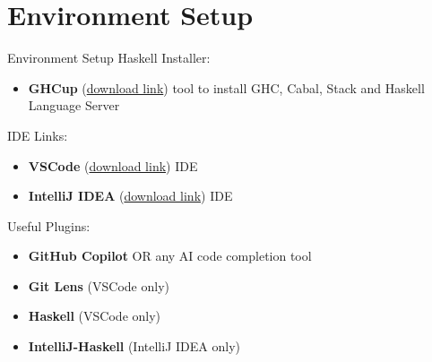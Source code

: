 \section{Environment Setup}
\begin{frame}{Environment Setup}
    Haskell Installer:
    \begin{itemize}
        \item \textbf{GHCup} (\href{https://www.haskell.org/ghcup/}{download link}) tool to install GHC, Cabal, Stack and Haskell Language Server
    \end{itemize}
    IDE Links:
    \begin{itemize}
        \item \textbf{VSCode} (\href{https://code.visualstudio.com/}{download link}) IDE
        \item \textbf{IntelliJ IDEA} (\href{https://www.jetbrains.com/idea/download/}{download link}) IDE 
    \end{itemize}
    Useful Plugins:
    \begin{itemize}
        \item \textbf{GitHub Copilot} OR any AI code completion tool
        \item \textbf{Git Lens} (VSCode only)
        \item \textbf{Haskell} (VSCode only)
        \item \textbf{IntelliJ-Haskell} (IntelliJ IDEA only)
    \end{itemize}
\end{frame}